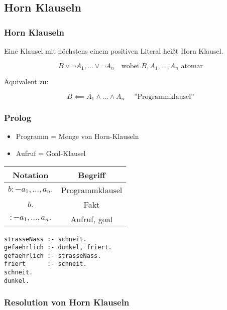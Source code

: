 \documentclass{scrartcl}
\begin{document}
\subsection{Horn Klauseln}

\subsubsection{Horn Klauseln}

Eine Klausel mit höchstens einem positiven Literal heißt Horn Klausel.

\[ B \vee \neg A_1, \ldots \vee \neg A_n \quad \text{wobei } B, A_1, \ldots, A_n \text{ atomar} \]

Äquivalent zu:

\[ B \impliedby A_1 \wedge \ldots \wedge A_n \quad \text{ ''Programmklausel''} \]

\subsubsection{Prolog}

\begin{itemize}
	\item Programm = Menge von Horn-Klauseln
	\item Aufruf = Goal-Klausel
\end{itemize}

\begin{minipage}{.5\textwidth}
	\begin{tabular}{|c|c|}
		\hline 
		Notation & Begriff \\ 
		\hline 
		$b :- a_1, \ldots, a_n.$ & Programmklausel \\ 
		\hline 
		$b.$ & Fakt \\ 
		\hline 
		$:- a_1, \ldots, a_n.$ & Aufruf, goal \\ 
		\hline 
	\end{tabular}
\end{minipage}
\begin{minipage}{.5\textwidth}
	\begin{lstlisting}
strasseNass :- schneit.
gefaehrlich :- dunkel, friert.
gefaehrlich :- strasseNass.
friert	    :- schneit.
schneit.
dunkel.
	\end{lstlisting}
\end{minipage}

\subsubsection{Resolution von Horn Klauseln}
\end{document}
